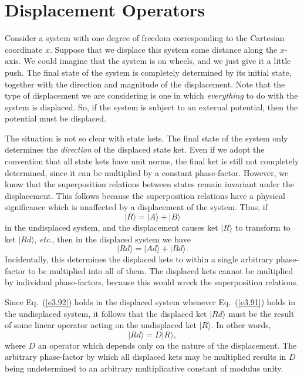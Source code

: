 \section{Displacement Operators}\label{s3.8}
Consider a system with one degree of freedom corresponding to the Cartesian
coordinate $x$. Suppose that we displace this system some distance along the $x$-axis.
We could imagine that the system is on wheels, and we just give it a little
push. The final state of the system is completely determined by its initial state,
together with the direction and magnitude of the displacement.
Note that the type of displacement we are considering is one in which
{\em everything} to do with the system is displaced. So, if the system is
subject to an external potential, then the potential must be  displaced.

The situation is not so clear with state kets. The final state
of the system only determines the {\em direction} of the displaced state ket. Even if
we adopt the  convention that all state kets have unit norms, the final ket is
still not completely determined, since it can be multiplied by a constant phase-factor. However, we know that the superposition relations between states 
remain invariant under the displacement. This follows because the superposition
relations have a physical significance which is unaffected by a displacement of
the system. 
Thus, if 
\begin{equation}\label{e3.91}
|R\rangle = |A\rangle + |B\rangle
\end{equation}
in the undisplaced system, and the displacement causes ket $|R\rangle$ to
transform to ket $|Rd\rangle$, {\em etc}., then in the displaced system we have
\begin{equation}\label{e3.92}
|Rd\rangle = |Ad\rangle + |Bd\rangle.
\end{equation}
Incidentally, this determines the displaced kets to within a single arbitrary phase-factor to be multiplied into all of them. The displaced kets cannot be multiplied by 
individual phase-factors, because this would wreck the superposition relations. 

Since Eq.~(\ref{e3.92}) holds in the displaced system whenever Eq.~(\ref{e3.91}) holds in the
undisplaced system, it follows that the displaced ket $|Rd\rangle$ must be the
result of some linear operator acting on the undisplaced ket
$|R\rangle$. In other
words,
\begin{equation}
|R d\rangle = D |R\rangle,
\end{equation}
where $D$ an  operator which depends only on the
nature of the displacement. The arbitrary phase-factor by which all
displaced kets may be multiplied results in $D$ being undetermined to an arbitrary
multiplicative constant of modulus unity. 

